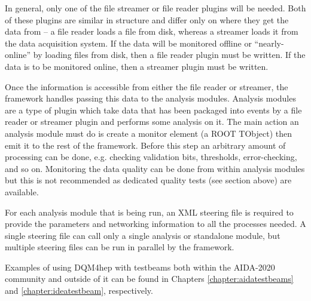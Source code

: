 In general, only one of the file streamer or file reader plugins will be needed. Both of these plugins are similar in structure and differ only on where they get the data from -- a file reader loads a file from disk, whereas a streamer loads it from the data acquisition system. If the data will be monitored offline or ``nearly-online'' by loading files from disk, then a file reader plugin must be written. If the data is to be monitored online, then a streamer plugin must be written. 

Once the information is accessible from either the file reader or streamer, the framework handles passing this data to the analysis modules. Analysis modules are a type of plugin which take data that has been packaged into events by a file reader or streamer plugin and performs some analysis on it. The main action an analysis module must do is create a monitor element (a ROOT TObject) then emit it to the rest of the framework. Before this step an arbitrary amount of processing can be done, e.g. checking validation bits, thresholds, error-checking, and so on. Monitoring the data quality can be done from within analysis modules but this is not recommended as dedicated quality tests (see section above) are available.

For each analysis module that is being run, an \acrshort{XML} steering file is required to provide the parameters and networking information to all the processes needed. A single steering file can call only a single analysis or standalone module, but multiple steering files can be run in parallel by the framework.

Examples of using \acrshort{DQM4hep} with testbeams both within the \acrshort{AIDA}-2020 community and outside of it can be found in Chapters \ref{chapter:aidatestbeams} and \ref{chapter:ideatestbeam}, respectively.
